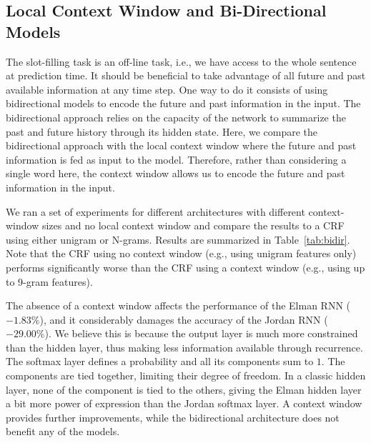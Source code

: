 \subsection{Local Context Window and Bi-Directional Models}

The slot-filling task is an off-line task, i.e., we have access to the whole
sentence at prediction time. It should be beneficial to take advantage of all
future and past available information at any time step. One way to do it
consists of using bidirectional models to encode the future and past
information in the input. The bidirectional approach relies on the capacity of
the network to summarize the past and future history through its hidden state.
Here, we compare the bidirectional approach with the local context window where
the future and past information is fed as input to the model. Therefore, rather
than considering a single word here, the context window allows us to encode the
future and past information in the input.

We ran a set of experiments for different architectures with different
context-window sizes and no local context window and compare the results to a
CRF using either unigram or N-grams. Results are summarized in Table~\ref{tab:bidir}. Note
that the CRF using no context window (e.g., using unigram features only)
performs significantly worse than the CRF using a context window (e.g., using
up to $9$-gram features). 

The absence of a context window affects the performance of the Elman RNN
($-1.83\%$), and it considerably damages the accuracy of the Jordan RNN ($-29.00\%$).
We believe this is because the output layer is much more constrained than the
hidden layer, thus making less information available through recurrence. The
softmax layer defines a probability and all its components sum to $1$. The
components are tied together, limiting their degree of freedom. In a classic
hidden layer, none of the component is tied to the others, giving the Elman
hidden layer a bit more power of expression than the Jordan softmax layer. A
context window provides further improvements, while the bidirectional
architecture does not benefit any of the models.

